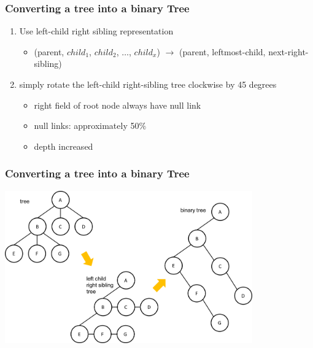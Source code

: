 \documentclass[newPxFont,sthlmFooter,nooffset]{beamer}
\begin{document}
\begin{frame}[t]
  \frametitle{Converting a tree into a binary Tree}
  \begin{enumerate}
  \item Use left-child right sibling representation
    \begin{itemize}
    \item (parent, $child_1$, $child_2$, $\ldots$, $child_x$)
      $\rightarrow$ (parent, leftmost-child, next-right-sibling)
    \end{itemize}

   \item simply rotate the left-child right-sibling tree clockwise by 45 degrees
     \begin{itemize}
     \item right field of root node always have null link
     \item null links: approximately 50$\%$
     \item depth increased
     \end{itemize}

  \end{enumerate}
\end{frame}


\begin{frame}[t]
  \frametitle{Converting a tree into a binary Tree}
  \begin{center}
    \includegraphics[width=0.8\textwidth]{figures/fig09_conversion.png}
  \end{center}

\end{frame}
\end{document}
